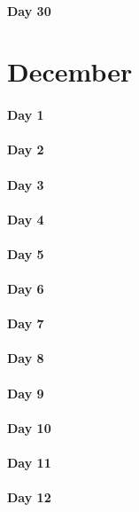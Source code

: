 \documentclass[UTF8,a4paper,8pt]{ctexart}
\begin{document}
 	 \paragraph{Day 30      \quad     }
\section{December}
 	 \paragraph{Day 1       \quad     }
 	 \paragraph{Day 2       \quad     }
 	 \paragraph{Day 3       \quad     }
 	 \paragraph{Day 4       \quad     }
 	 \paragraph{Day 5       \quad     }
 	 \paragraph{Day 6       \quad     }
 	 \paragraph{Day 7       \quad     }
 	 \paragraph{Day 8       \quad     }
 	 \paragraph{Day 9       \quad     }
 	 \paragraph{Day 10      \quad     }
 	 \paragraph{Day 11      \quad     }
 	 \paragraph{Day 12      \quad     }
\end{document}
